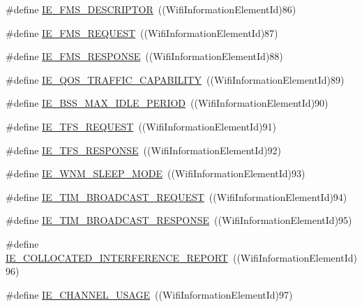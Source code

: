 \begin{DoxyCompactItemize}
\#define \hyperlink{wifi-information-element_8h_a17f822cd08276b9e183a91f9196c98b7}{I\+E\+\_\+\+F\+M\+S\+\_\+\+D\+E\+S\+C\+R\+I\+P\+T\+OR}~((Wifi\+Information\+Element\+Id)86)
\item 
\#define \hyperlink{wifi-information-element_8h_a555f3d40b4eb3b3afb53d5ec1865ac8b}{I\+E\+\_\+\+F\+M\+S\+\_\+\+R\+E\+Q\+U\+E\+ST}~((Wifi\+Information\+Element\+Id)87)
\item 
\#define \hyperlink{wifi-information-element_8h_a4ad3c6699a60ce005d5cbf29b8f3dda8}{I\+E\+\_\+\+F\+M\+S\+\_\+\+R\+E\+S\+P\+O\+N\+SE}~((Wifi\+Information\+Element\+Id)88)
\item 
\#define \hyperlink{wifi-information-element_8h_a66d70cc0d8d226b5d262347a68e93b99}{I\+E\+\_\+\+Q\+O\+S\+\_\+\+T\+R\+A\+F\+F\+I\+C\+\_\+\+C\+A\+P\+A\+B\+I\+L\+I\+TY}~((Wifi\+Information\+Element\+Id)89)
\item 
\#define \hyperlink{wifi-information-element_8h_a825ec3a19b3e9604b1d89998c8b08df7}{I\+E\+\_\+\+B\+S\+S\+\_\+\+M\+A\+X\+\_\+\+I\+D\+L\+E\+\_\+\+P\+E\+R\+I\+OD}~((Wifi\+Information\+Element\+Id)90)
\item 
\#define \hyperlink{wifi-information-element_8h_aa6fcea835a2675336deaab1ada22e3d7}{I\+E\+\_\+\+T\+F\+S\+\_\+\+R\+E\+Q\+U\+E\+ST}~((Wifi\+Information\+Element\+Id)91)
\item 
\#define \hyperlink{wifi-information-element_8h_a1fea96edd863d4a42b17760ec680d350}{I\+E\+\_\+\+T\+F\+S\+\_\+\+R\+E\+S\+P\+O\+N\+SE}~((Wifi\+Information\+Element\+Id)92)
\item 
\#define \hyperlink{wifi-information-element_8h_a5d00cee6ae2c7ca50eab10586895486b}{I\+E\+\_\+\+W\+N\+M\+\_\+\+S\+L\+E\+E\+P\+\_\+\+M\+O\+DE}~((Wifi\+Information\+Element\+Id)93)
\item 
\#define \hyperlink{wifi-information-element_8h_a03eac92d67c69f42fd810c280eceb26f}{I\+E\+\_\+\+T\+I\+M\+\_\+\+B\+R\+O\+A\+D\+C\+A\+S\+T\+\_\+\+R\+E\+Q\+U\+E\+ST}~((Wifi\+Information\+Element\+Id)94)
\item 
\#define \hyperlink{wifi-information-element_8h_aeff212ccf2c40bd719e0efd22f512fec}{I\+E\+\_\+\+T\+I\+M\+\_\+\+B\+R\+O\+A\+D\+C\+A\+S\+T\+\_\+\+R\+E\+S\+P\+O\+N\+SE}~((Wifi\+Information\+Element\+Id)95)
\item 
\#define \hyperlink{wifi-information-element_8h_af36c5db9b127ae6ad705552a801221cf}{I\+E\+\_\+\+C\+O\+L\+L\+O\+C\+A\+T\+E\+D\+\_\+\+I\+N\+T\+E\+R\+F\+E\+R\+E\+N\+C\+E\+\_\+\+R\+E\+P\+O\+RT}~((Wifi\+Information\+Element\+Id)96)
\item 
\#define \hyperlink{wifi-information-element_8h_a0602ab681b00253e8fc3e646b3e3d82c}{I\+E\+\_\+\+C\+H\+A\+N\+N\+E\+L\+\_\+\+U\+S\+A\+GE}~((Wifi\+Information\+Element\+Id)97)

\end{DoxyCompactItemize}
